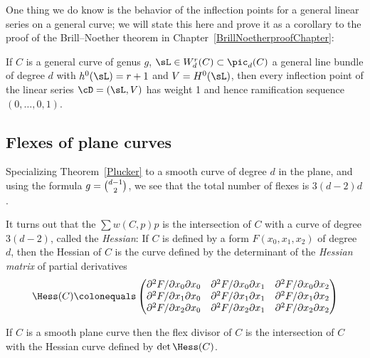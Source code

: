 One thing we do know is the behavior of the inflection points for a
general linear series on a general curve; we will state this here and
prove it as a corollary to the proof of the Brill--Noether theorem in
Chapter~\ref{BrillNoetherproofChapter}:

\begin{theorem}\label{Brill Noether Plucker}
If $C$ is a general curve of genus $g$, $\sL \in W^r_d(C) \subset
\pic_d(C)$ a general line bundle of degree $d$ with $h^0(\sL) = r+1$ and
$V = H^0(\sL)$, then every inflection point of the linear series $\cD =
(\sL, V)$ has weight 1 and hence ramification sequence $(0, \dots, 0, 1)$.
\end{theorem}


\subsection*{Flexes of plane curves}
\label{plane curve pluecker}

Specializing Theorem~\ref{Plucker} to a smooth curve of degree $d$
in the plane, and using the formula
$g= \tbinom{d-1}{2}$, we see that the total number of flexes is $3(d-2)d$.

It turns out that the 
%
$\sum w(C, p)p$
is the intersection of $C$ with a curve of degree $3(d-2)$, called the
%
%
\emph{Hessian}: If $C$ is defined by a form $F(x_0, x_1, x_2)$ of degree
$d$, then
the Hessian of $C$ is the curve defined by the determinant of the
\emph{Hessian matrix} of partial derivatives
$$
\Hess(C) \colonequals
\begin{pmatrix}
 \partial^2 F/\partial x_0 \partial x_0 & \partial^2 F/\partial x_0
 \partial x_1 & \partial^2 F/\partial x_0 \partial x_2 \\
\partial^2 F/\partial x_1 \partial x_0 & \partial^2 F/\partial x_1
\partial x_1 & \partial^2 F/\partial x_1 \partial x_2 \\
\partial^2 F/\partial x_2 \partial x_0 & \partial^2 F/\partial x_2
\partial x_1 & \partial^2 F/\partial x_2 \partial x_2
\end{pmatrix}
$$

\begin{theorem}\label{Hessian} If $C$ is a smooth plane curve then the
%
flex divisor of $C$ is the intersection
of $C$ with the Hessian curve defined by $\det \Hess(C)$.
\unif
\end{theorem}


